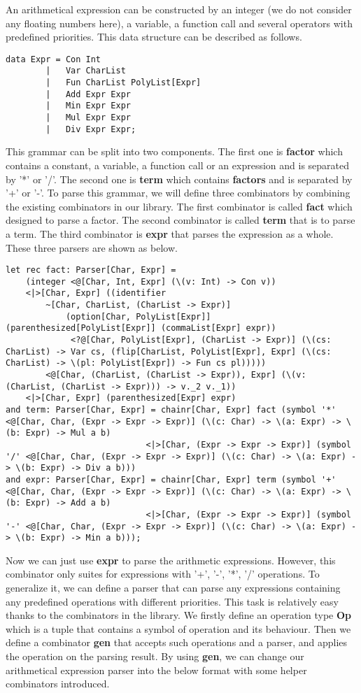 An arithmetical expression can be constructed by an integer (we do not consider any floating numbers here), a variable, a function call and several operators with predefined priorities. This data structure can be described as follows.
\begin{lstlisting}
data Expr = Con Int
		|	Var CharList
		|	Fun CharList PolyList[Expr]
		|	Add Expr Expr
		|	Min Expr Expr
		|	Mul Expr Expr
		|	Div Expr Expr;
\end{lstlisting}
This grammar can be split into two components. The first one is \textbf{factor} which contains a constant, a variable, a function call or an expression and is separated by '*' or '/'.  The second one is \textbf{term} which contains \textbf{factors} and is separated by '+' or '-'.
To parse this grammar, we will define three combinators by combining the existing combinators in our library. The first combinator is called \textbf{fact} which designed to parse a factor. The second combinator is called \textbf{term} that is to parse a term. The third combinator is \textbf{expr} that parses the expression as a whole. These three parsers are shown as below.
\begin{lstlisting}
let rec fact: Parser[Char, Expr] =
	(integer <@[Char, Int, Expr] (\(v: Int) -> Con v))
	<|>[Char, Expr] ((identifier 
		~[Char, CharList, (CharList -> Expr)]
			(option[Char, PolyList[Expr]] (parenthesized[PolyList[Expr]] (commaList[Expr] expr))
			 <?@[Char, PolyList[Expr], (CharList -> Expr)] (\(cs: CharList) -> Var cs, (flip[CharList, PolyList[Expr], Expr] (\(cs: CharList) -> \(pl: PolyList[Expr]) -> Fun cs pl)))))
		<@[Char, (CharList, (CharList -> Expr)), Expr] (\(v: (CharList, (CharList -> Expr))) -> v._2 v._1))
	<|>[Char, Expr] (parenthesized[Expr] expr)
and term: Parser[Char, Expr] = chainr[Char, Expr] fact (symbol '*' <@[Char, Char, (Expr -> Expr -> Expr)] (\(c: Char) -> \(a: Expr) -> \(b: Expr) -> Mul a b)
							<|>[Char, (Expr -> Expr -> Expr)] (symbol '/' <@[Char, Char, (Expr -> Expr -> Expr)] (\(c: Char) -> \(a: Expr) -> \(b: Expr) -> Div a b)))
and expr: Parser[Char, Expr] = chainr[Char, Expr] term (symbol '+' <@[Char, Char, (Expr -> Expr -> Expr)] (\(c: Char) -> \(a: Expr) -> \(b: Expr) -> Add a b)
							<|>[Char, (Expr -> Expr -> Expr)] (symbol '-' <@[Char, Char, (Expr -> Expr -> Expr)] (\(c: Char) -> \(a: Expr) -> \(b: Expr) -> Min a b)));
\end{lstlisting}
Now we can just use \textbf{expr} to parse the arithmetic expressions. However, this combinator only suites for expressions with '+', '-', '*', '/' operations. To generalize it, we can define a parser that can parse any expressions containing any predefined operations with different priorities. This task is relatively easy thanks to the combinators in the library. We firstly define an operation type \textbf{Op} which is a tuple that contains a symbol of operation and its behaviour. Then we define a combinator \textbf{gen} that accepts such operations and a parser, and applies the operation on the parsing result. By using \textbf{gen}, we can change our arithmetical expression parser into the below format with some helper combinators introduced.
